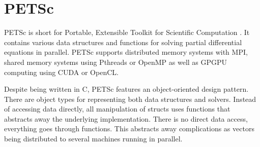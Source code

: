 \section{PETSc}

PETSc is short for Portable, Extensible Toolkit for Scientific Computation 
\cite{petsc-web-page}. It contains various data structures and functions for 
solving partial differential equations in parallel. PETSc supports distributed 
memory systems with MPI, shared memory systems using Pthreads or OpenMP as well 
as GPGPU computing using CUDA or OpenCL.

Despite being written in C, PETSc features an object-oriented design pattern.
There are object types for representing both data structures and solvers.
Instead of accessing data directly, all manipulation of structs uses functions
that abstracts away the underlying implementation. There is no direct data
access, everything goes through functions. This abstracts away complications as 
vectors being distributed to several machines running in parallel.

